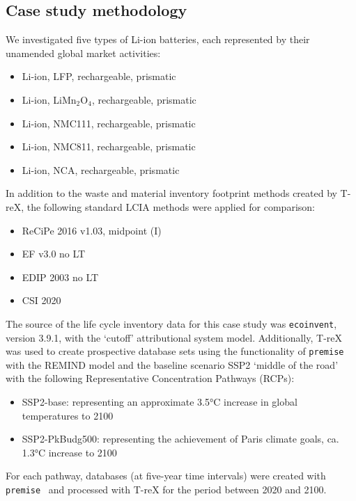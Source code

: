 \subsection{Case study methodology}\label{sec:method-casestudy}

We investigated five types of Li-ion batteries, each represented by their unamended global market activities:
\begin{itemize}[itemsep=0pt]
    \item Li-ion, LFP, rechargeable, prismatic
    \item Li-ion, LiMn\(_2\)O\(_4\), rechargeable, prismatic
    \item Li-ion, NMC111, rechargeable, prismatic
    \item Li-ion, NMC811, rechargeable, prismatic
    \item Li-ion, NCA, rechargeable, prismatic
\end{itemize}

In addition to the waste and material inventory footprint methods created by T-reX, the following standard LCIA methods were applied for comparison:

\begin{itemize}[itemsep=0pt]
    \item ReCiPe 2016 v1.03, midpoint (I)
    \item EF v3.0 no LT
    \item EDIP 2003 no LT
    \item CSI 2020
\end{itemize}

The source of the life cycle inventory data for this case study was \texttt{ecoinvent}, version 3.9.1, with the `cutoff' attributional system model. Additionally, T-reX was used to create prospective database sets using the functionality of \texttt{premise} with the REMIND model and the baseline scenario SSP2 `middle of the road' with the following Representative Concentration Pathways (RCPs):
\begin{itemize}
    \item SSP2-base: representing an approximate 3.5°C increase in global temperatures to 2100
    \item SSP2-PkBudg500: representing the achievement of Paris climate goals, ca. 1.3°C increase to 2100
\end{itemize}

For each pathway, databases (at five-year time intervals) were created with \texttt{premise}~\citep{sacchi2022premise} and processed with T-reX for the period between 2020 and 2100.

